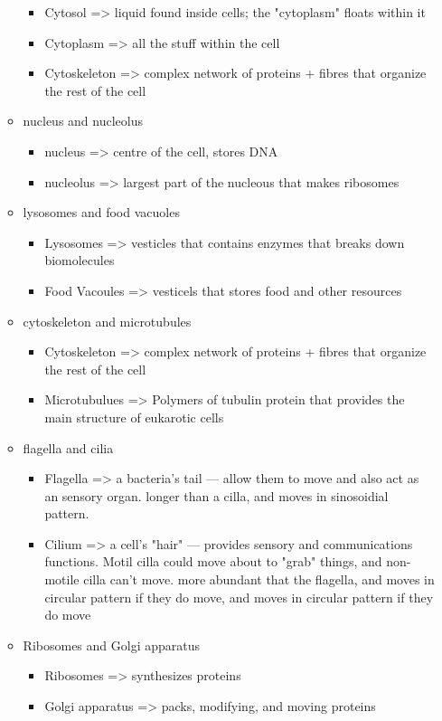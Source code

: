 \documentclass[letterpaper]{article}
\begin{document}
\begin{itemize}
\begin{itemize}
\begin{itemize}
\item Cytosol => liquid found inside cells; the "cytoplasm" floats
within it
\item Cytoplasm => all the stuff within the cell
\item Cytoskeleton => complex network of proteins + fibres that organize
the rest of the cell
\end{itemize}

\item nucleus and nucleolus

\begin{itemize}
\item nucleus => centre of the cell, stores DNA
\item nucleolus => largest part of the nucleous that makes ribosomes
\end{itemize}

\item lysosomes and food vacuoles

\begin{itemize}
\item Lysosomes => vesticles that contains enzymes that breaks down
biomolecules
\item Food Vacoules => vesticels that stores food and other resources
\end{itemize}

\item cytoskeleton and microtubules

\begin{itemize}
\item Cytoskeleton => complex network of proteins + fibres that organize
the rest of the cell
\item Microtubulues => Polymers of tubulin protein that provides the
main structure of eukarotic cells
\end{itemize}

\item flagella and cilia

\begin{itemize}
\item Flagella => a bacteria's tail --- allow them to move and also act
as an sensory organ. longer than a cilla, and moves in sinosoidial
pattern.
\item Cilium => a cell's "hair" --- provides sensory and communications
functions. Motil cilla could move about to "grab" things, and
non-motile cilla can't move. more abundant that the flagella, and
moves in circular pattern if they do move, and moves in circular
pattern if they do move
\end{itemize}

\item Ribosomes and Golgi apparatus

\begin{itemize}
\item Ribosomes => synthesizes proteins
\item Golgi apparatus => packs, modifying, and moving proteins
\end{itemize}
\end{itemize}
\end{itemize}
\end{document}
